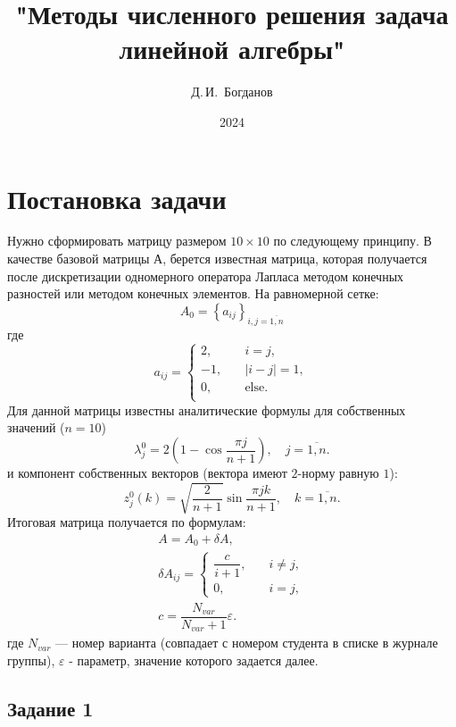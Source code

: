 \documentclass[a4paper,14pt]{extarticle}
\renewcommand{\epsilon}{\varepsilon}
\begin{document}
\title{"Методы численного решения задача линейной алгебры"}
\author{Д.\,И.~Богданов}
\date{2024}
\maketitle


\newpage
\tableofcontents
\newpage


\section{Постановка задачи}


Нужно сформировать матрицу размером $10 \times 10$ по следующему принципу. В качестве базовой матрицы $А$, берется известная матрица, которая получается после дискретизации одномерного оператора Лапласа методом конечных разностей или методом конечных элементов. На равномерной сетке:
\[
A_0 = \left\lbrace a_{ij} \right\rbrace_{i, j = \overline{1, n}}
\]
где
\[
a_{ij} = \begin{cases}
2, \quad &i = j, \\
-1, \quad &|i-j| = 1, \\
0, \quad &\text{else}. \\
\end{cases}
\]
Для данной матрицы известны аналитические формулы для собственных значений ($n = 10$)
\[
\lambda_j^0 =2 (1 - \cos \dfrac{\pi j}{n + 1}),
\quad j = \overline{1, n}.
\]
и компонент собственных векторов (вектора имеют $2$-норму равную $1$):
\[
z_j^0 (k) = \sqrt{\dfrac{2}{n+1}} \sin \dfrac{\pi j k}{n+1},
\quad k = \overline{1, n}.
\]
Итоговая матрица получается по формулам:
\begin{gather*}
A = A_0 + \delta A, \\
\delta A_{ij} = \begin{cases}
\dfrac{c}{i + 1}, \quad &i \neq j, \\
0, \quad &i = j,
\end{cases} \\
c = \dfrac{N_{var}}{N_{var} + 1} \epsilon.
\end{gather*}
где $N_{var}$ --- номер варианта (совпадает с номером студента в списке в журнале
группы), $\epsilon$ - параметр, значение которого задается далее.

\subsection{Задание 1}
\end{document}
